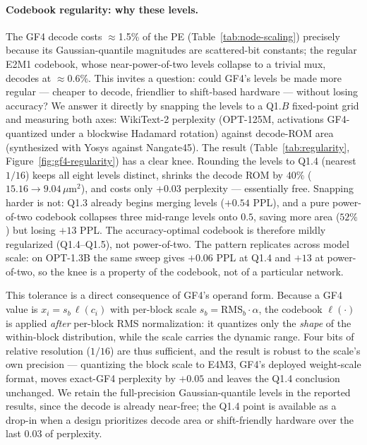 \paragraph{Codebook regularity: why these levels.} The GF4 decode costs
$\approx$1.5\% of the PE (Table~\ref{tab:node-scaling}) precisely because its
Gaussian-quantile magnitudes are scattered-bit constants; the regular E2M1
codebook, whose near-power-of-two levels collapse to a trivial mux, decodes at
$\approx$0.6\%. This invites a question: could GF4's levels be made more regular
--- cheaper to decode, friendlier to shift-based hardware --- without losing
accuracy? We answer it directly by snapping the levels to a Q1.$B$ fixed-point
grid and measuring both axes: WikiText-2 perplexity (OPT-125M, activations
GF4-quantized under a blockwise Hadamard rotation) against decode-ROM area
(synthesized with Yosys against Nangate45). The result (Table~\ref{tab:regularity},
Figure~\ref{fig:gf4-regularity}) has a clear knee. Rounding the levels to Q1.4
(nearest $1/16$) keeps all eight levels distinct, shrinks the decode ROM by
$40\%$ ($15.16\!\rightarrow\!9.04\,\mu\text{m}^2$), and costs only $+0.03$
perplexity --- essentially free. Snapping harder is not: Q1.3 already begins
merging levels ($+0.54$ PPL), and a pure power-of-two codebook collapses three
mid-range levels onto $0.5$, saving more area ($52\%$) but losing $+13$ PPL. The
accuracy-optimal codebook is therefore mildly regularized (Q1.4--Q1.5), not
power-of-two. The pattern replicates across model scale: on OPT-1.3B the same
sweep gives $+0.06$ PPL at Q1.4 and $+13$ at power-of-two, so the knee is a
property of the codebook, not of a particular network.

This tolerance is a direct consequence of GF4's operand form. Because a GF4 value
is $x_i = s_b\,\ell(c_i)$ with per-block scale $s_b = \text{RMS}_b\cdot\alpha$,
the codebook $\ell(\cdot)$ is applied \emph{after} per-block RMS normalization: it
quantizes only the \emph{shape} of the within-block distribution, while the scale
carries the dynamic range. Four bits of relative resolution ($1/16$) are thus
sufficient, and the result is robust to the scale's own precision --- quantizing
the block scale to E4M3, GF4's deployed weight-scale format, moves exact-GF4
perplexity by $+0.05$ and leaves the Q1.4 conclusion unchanged. We retain the
full-precision Gaussian-quantile levels in the reported results, since the decode
is already near-free; the Q1.4 point is available as a drop-in when a design
prioritizes decode area or shift-friendly hardware over the last $0.03$ of
perplexity.

